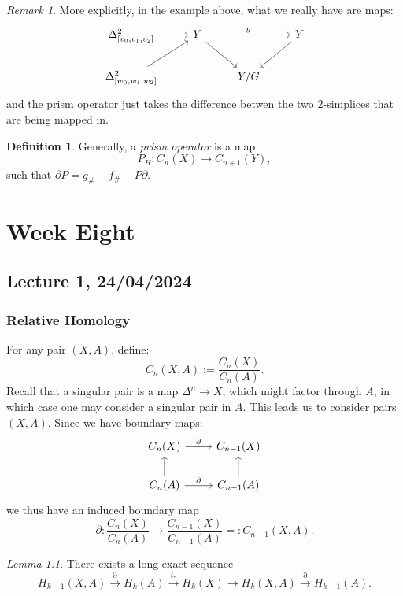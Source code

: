 \documentclass[a4paper]{report}
\theoremstyle{definition}
\newtheorem{definition}{Definition}
\theoremstyle{remark}
\newtheorem{remark}{Remark}
\theoremstyle{proposition}
\theoremstyle{conjecture}
\theoremstyle{lemma}
\newtheorem{lemma}{Lemma}
\theoremstyle{corollary}
\theoremstyle{exercise}
\begin{document}
\begin{remark}
    More explicitly, in the example above, what we really have are maps:
    $$\begin{tikzcd}
        {\Delta^2_{[v_0,v_1,v_2]}} \arrow[r]  & Y \arrow[rd] \arrow[rr, "g"] &     & Y \arrow[ld] \\
        {\Delta^2_{[w_0,w_1,w_2]}} \arrow[ru] &                              & Y/G &             
        \end{tikzcd}$$
    and the prism operator just takes the difference betwen the two $2$-simplices that are being mapped in.
\end{remark}

\begin{definition}
    Generally, a \emph{prism operator} is a map 
    $$P_H :  C_n(X) \longrightarrow C_{n+1}(Y),$$ 
    such that $\partial P = g_\# - f_\# - P \partial$.
\end{definition}

\chapter{Week Eight}

\section{Lecture 1, 24/04/2024}

\subsection{Relative Homology} 

For any pair $(X,A)$, define: 
$$C_n(X,A) := \frac{C_n(X)}{C_n(A)}.$$
Recall that a singular pair is a map $\Delta^n \to X$, which might factor through $A$, in which 
case one may consider a singular pair in $A$. This leads us to consider pairs $(X,A)$.
Since we have boundary maps:
$$\begin{tikzcd}
    C_n(X) \arrow[r, "\partial"]           & C_{n-1}(X)           \\
    C_n(A) \arrow[u] \arrow[r, "\partial"] & C_{n-1}(A) \arrow[u]
\end{tikzcd}$$
we thus have an induced boundary map
$$\partial : \frac{C_n(X)}{C_n(A)} \longrightarrow \frac{C_{n-1}(X)}{C_{n-1}(A)} =: C_{n-1}(X,A).$$

\begin{lemma}
    There exists a long exact sequence 
    $$H_{k-1}(X,A) \stackrel{\partial}{\longrightarrow} H_k(A) \stackrel{i_\ast}{\longrightarrow} H_k(X) \longrightarrow H_k(X,A) \stackrel{\partial}{\longrightarrow} H_{k-1}(A).$$
\end{lemma}
\end{document}
